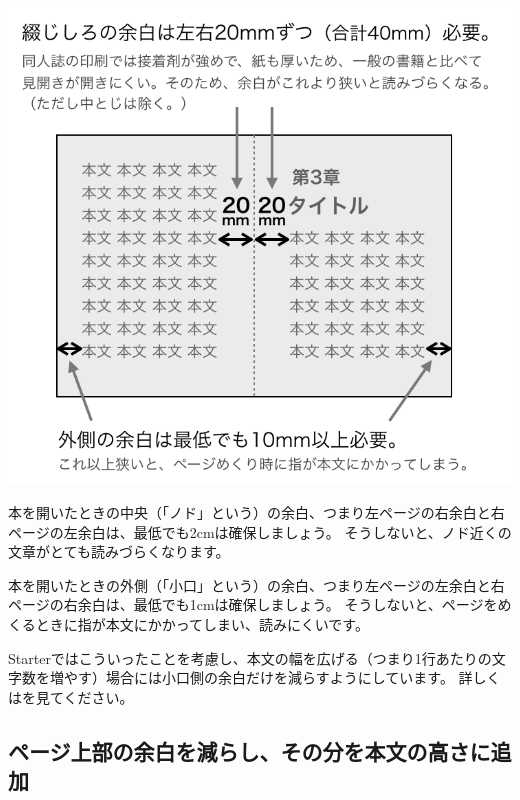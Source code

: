 \begin{reviewimage}%
\includegraphics[width=0.7\maxwidth]{./images/chap01-starter/margin_book.png}%
\label{image:chap01-starter:margin_book}
\end{reviewimage}

\begin{starteritemize}
\item 本を開いたときの中央（「ノド」という）の余白、つまり左ページの右余白と右ページの左余白は、最低でも2cmは確保しましょう。
   そうしないと、ノド近くの文章がとても読みづらくなります。
\item 本を開いたときの外側（「小口」という）の余白、つまり左ページの左余白と右ページの右余白は、最低でも1cmは確保しましょう。
   そうしないと、ページをめくるときに指が本文にかかってしまい、読みにくいです。
\end{starteritemize}

Starterではこういったことを考慮し、本文の幅を広げる（つまり1行あたりの文字数を増やす）場合には小口側の余白だけを減らすようにしています。
詳しくはを見てください。

\subsection*{ページ上部の余白を減らし、その分を本文の高さに追加}
\label{sec:1-2-6}

